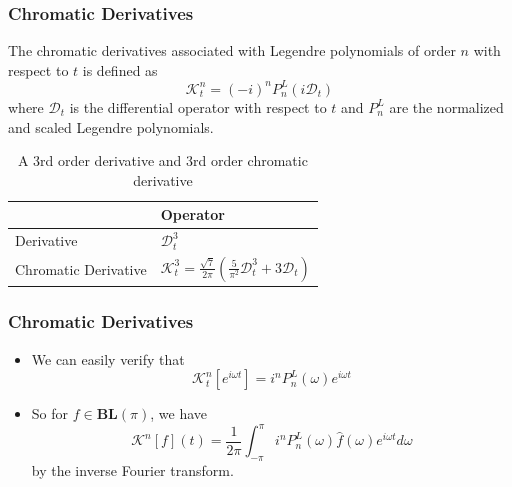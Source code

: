 \documentclass{beamer}
\begin{document}
\begin{frame}
\frametitle{Chromatic Derivatives}
The chromatic derivatives associated with Legendre polynomials of order $n$ 
with respect to $t$ is defined as
\begin{equation}
	\mathcal{K}_t^n = (-i)^n P_n^L(i\mathcal{D}_t)
\end{equation}
where $\mathcal{D}_t$ is the differential operator with respect to $t$ and
$P_n^L$ are the normalized and scaled Legendre polynomials.
\begin{example}
\begin{table}
\begin{tabular}{l l}
 & Operator \\
\midrule
Derivative & $\mathcal{D}_t^3$ \\
Chromatic Derivative & $\mathcal{K}_t^3 = \frac{\sqrt{7}}{2\pi} \left ( \frac{5}{\pi^2} \mathcal{D}_t^3 + 3 \mathcal{D}_t \right )$ \\
\bottomrule
\end{tabular}
\caption{A 3rd order derivative and 3rd order chromatic derivative}
\end{table}
\end{example}
\end{frame}


\begin{frame}
\frametitle{Chromatic Derivatives}
\begin{itemize}
	\item We can easily verify that
		\begin{equation*}
			\mathcal{K}_t^n[e^{i\omega t}] = i^n P_n^L(\omega) e^{i\omega t}
		\end{equation*}
	\item So for $f \in \mathbf{BL}(\pi)$, we have
		\begin{equation*}
			\mathcal{K}^n[f](t) = \frac{1}{2\pi} \int_{-\pi}^{\pi} i^n P_n^L(\omega) \hat{f}(\omega) e^{i\omega t} d\omega
		\end{equation*}
		by the inverse Fourier transform.
\end{itemize}
\end{frame}

\end{document}
